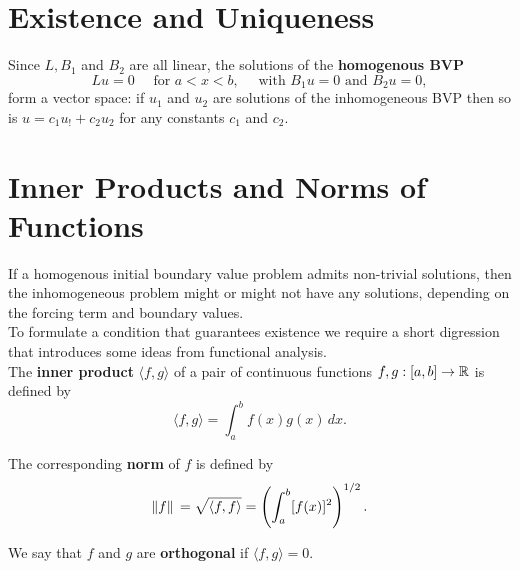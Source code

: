 \section{Existence and Uniqueness}
Since \(L, B_1\) and \(B_2\) are all linear, the solutions of the \textbf{homogenous BVP}
\[Lu = 0 \quad \text{ for } a < x < b, \quad \text{ with } B_1u = 0 \text{ and } B_2u = 0,\]
form a vector space: if \(u_1\) and \(u_2\) are solutions of the inhomogeneous BVP then so is \(u = c_1u_! + c_2u_2\) for any constants \(c_1\) and \(c_2\).



\section{Inner Products and Norms of Functions}
If a homogenous initial boundary value problem admits non-trivial solutions, then the inhomogeneous problem might or might not have any solutions, depending on the forcing term and boundary values. \\

To formulate a condition that guarantees existence we require a short digression that introduces some ideas from functional analysis. \\

The \textbf{inner product} \(\langle f, g \rangle\) of a pair of continuous functions \(f, g : [a, b] \to \mathbb{R}\) is defined by
\[\langle f, g \rangle = \int_a^b f(x)g(x) \, dx.\]

The corresponding \textbf{norm} of \(f\) is defined by
\[\norm*{f} = \sqrt{\langle f, f \rangle} = \left(\int_{a}^{b}[f(x)]^2\right)^{1/2}.\]

We say that \(f\) and \(g\) are \textbf{orthogonal} if \(\langle f, g \rangle = 0\).


